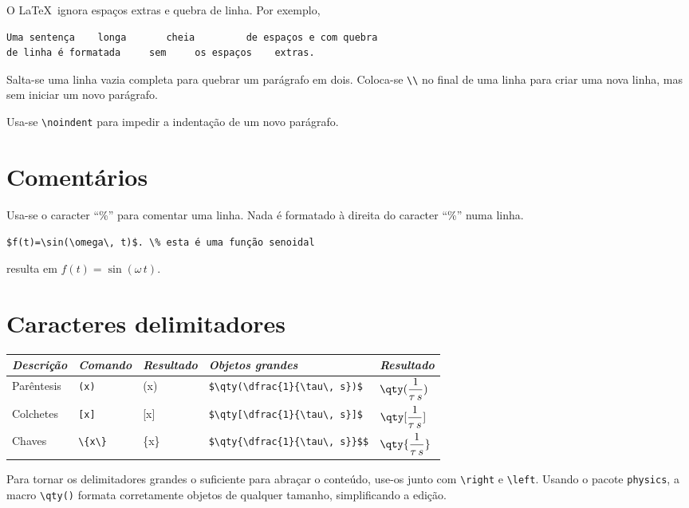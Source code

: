 O \LaTeX\ ignora espaços extras e quebra de linha. Por exemplo, 
\begin{lstlisting}[language={[Latex]Tex},frame=single]
Uma sentença    longa       cheia         de espaços e com quebra 
de linha é formatada     sem     os espaços    extras.
\end{lstlisting}



Salta-se uma linha vazia completa para quebrar um parágrafo em  dois. Coloca-se \verb|\\| no final de uma linha para criar uma nova linha, mas sem iniciar um novo parágrafo.

Usa-se  \verb|\noindent| para impedir a indentação de um novo parágrafo.

\section{Comentários}

Usa-se o caracter ``\%''   para comentar uma linha. Nada é formatado à direita  do caracter ``\%'' numa linha.

 \verb|$f(t)=\sin(\omega\, t)$. \% esta é uma função senoidal| 
 
 resulta em $f(t)=\sin(\omega\, t)$. %

\section{Caracteres delimitadores}

\begin{tabular}{lllll}
	\toprule
	\emph{Descrição} & \emph{Comando}  & \emph{Resultado} &\emph{Objetos grandes} & \emph{Resultado}\\
	\midrule
	Parêntesis &\verb|(x)| & (x) &\verb|$\qty(\dfrac{1}{\tau\, s})$| & $\qty(\dfrac{1}{\tau\, s})$\\
	Colchetes &\verb|[x]| & [x]&\verb|$\qty[\dfrac{1}{\tau\, s}]$| & $\qty[\dfrac{1}{\tau\, s}]$\\
	Chaves & \verb|\{x\}| & \{x\}&\verb|$\qty{\dfrac{1}{\tau\, s}}$$| & $\qty{\dfrac{1}{\tau\, s}}$\\
	\bottomrule
\end{tabular}

Para tornar os delimitadores grandes o suficiente para abraçar o conteúdo, use-os junto com \verb|\right| e \verb|\left|. Usando o pacote \texttt{physics},  a macro \verb|\qty()| formata corretamente objetos de qualquer tamanho, simplificando a edição.

